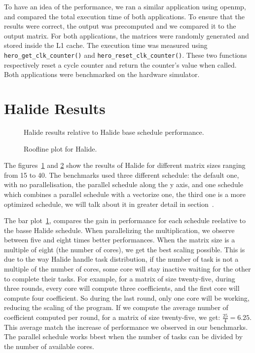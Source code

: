 	To have an idea of the performance, we ran a similar application using \gls{openmp}, and compared the total execution time of both applications.
	To ensure that the results were correct, the output was precomputed and we compared it to the output matrix.
	For both applications, the matrices were randomly generated and stored inside the L1 cache.
	The execution time was measured using \texttt{hero\_get\_clk\_counter()} and \texttt{hero\_reset\_clk\_counter()}.
	These two functions respectively reset a cycle counter and return the counter's value when called. 
	Both applications were benchmarked on the hardware simulator.
\section{Halide Results}

\begin{figure}[H]
		\center
		\scalebox{.8}{}
    \caption{Halide results relative to Halide base schedule performance.}
	\label{fig:barPlotHalide}
\end{figure}



\begin{figure}[H]
		\center
	\scalebox{.8}{}
    \caption{Roofline plot for Halide.}
	\label{fig:rooflineHalide}
\end{figure}



	The figures~\ref{fig:barPlotHalide} and \ref{fig:rooflineHalide} show the results of Halide for different matrix sizes ranging from 15 to 40.
	The benchmarks used three different schedule: the default one, with no parallelisation, the parallel schedule along the y axis, and one schedule which combines a parallel schedule with a vectorize one, the third one is a more optimized schedule, we will talk about it in greater detail in section~.

	The bar plot~\ref{fig:barPlotHalide}, compares the gain in  performance for each schedule reelative to the basse Halide schedule. When parallelizing the multiplication, we observe between five and eight times better performances. When the matrix size is a multiple of eight (the number of cores), we get the best scaling possible.
	This is due to the way Halide handle task distribution, if the number of task is not a multiple of the number of cores, some core will stay inactive waiting for the other to complete their tasks.
	For example, for a matrix of size twenty-five, during three rounds, every core will compute three coefficients, and the first core will compute four coefficient.
	So during the last round, only one core will be working, reducing the scaling of the program.
	If we compute the average number of coefficient computed per round, for a matrix of size twenty-five, we get: $\frac{25}{4}=6.25$.
	 This average match the increase of performance we observed in our benchmarks.
	 The parallel schedule works bbest when the number of tasks can be divided by the number of available cores.



